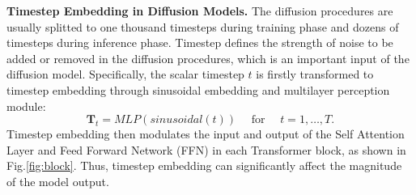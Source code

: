 \textbf{Timestep Embedding in Diffusion Models.} 
The diffusion procedures are usually splitted to one thousand timesteps during training phase and dozens of timesteps during inference phase. Timestep defines the strength of noise to be added or removed in the diffusion procedures, which is an important input of the diffusion model. Specifically, the scalar timestep $t$ is firstly transformed to timestep embedding through sinusoidal embedding and multilayer perception module:
\begin{equation}
\mathbf{T}_{t} = MLP(sinusoidal(t))\quad \text { for } \quad t=1, \ldots, T.
\end{equation}
Timestep embedding then modulates the input and output of the Self Attention Layer and Feed Forward Network (FFN) in each Transformer block, as shown in Fig.\ref{fig:block}. Thus, timestep embedding can significantly affect the magnitude of the model output.



